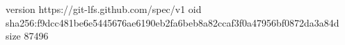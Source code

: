 version https://git-lfs.github.com/spec/v1
oid sha256:f9dcc481be6e5445676ae6190eb2fa6beb8a82ccaf3f0a47956bf0872da3a84d
size 87496
